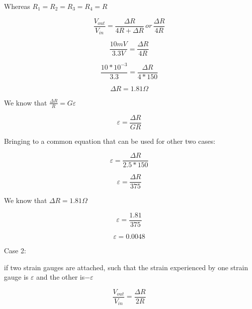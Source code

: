 \documentclass{article}
\begin{document}
Whereas $R_1 = R_2 = R_3 = R_4 = R$

\begin{equation*}
    \frac{V_{out}}{V_{in}} = \frac{\Delta R}{ 4R + \Delta R} \, or \,  \frac{\Delta R}{ 4R}
\end{equation*}

\begin{equation*}
    \frac{10mV}{3.3V} = \frac{\Delta R}{ 4R}
\end{equation*}

\begin{equation*}
    \frac{10*10^{-3}}{3.3} = \frac{\Delta R}{ 4*150}
\end{equation*}

\begin{equation*}
    \Delta R = 1.81 \Omega
\end{equation*}

We know that $\frac{\Delta R}{R} = G \varepsilon $

\begin{equation*}
    \varepsilon = \frac{\Delta R}{GR}
\end{equation*}



Bringing to a common equation that can be used for other two cases:

\begin{equation*}
    \varepsilon = \frac{\Delta R}{2.5*150}
\end{equation*}

\begin{equation*}
    \varepsilon = \frac{\Delta R}{375}
\end{equation*}

We know that $\Delta R = 1.81 \Omega$

\begin{equation*}
    \varepsilon = \frac{1.81}{375}
\end{equation*}

\begin{equation*}
    \varepsilon = 0.0048
\end{equation*}

Case 2:

if two strain gauges are attached, such that the strain 
experienced by one strain gauge is $\varepsilon$ and the other is$ - \varepsilon$

\begin{equation*}
    \frac{V_{out}}{V_{in}} = \frac{\Delta R}{ 2R}
\end{equation*}
\end{document}
